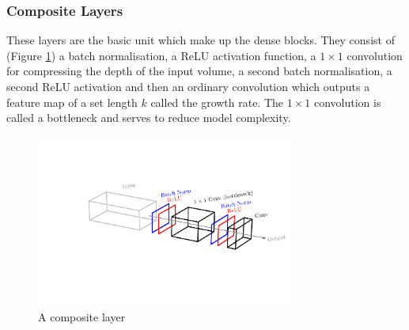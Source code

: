 \subsubsection{Composite Layers}
These layers are the basic unit which make up the dense blocks. They consist of (Figure \ref{fig:machine_learning:composite_layer}) a batch normalisation, a ReLU activation function, a $1\times{}1$ convolution for compressing the depth of the input volume, a second batch normalisation, a second ReLU activation and then an ordinary convolution which outputs a feature map of a set length $k$ called the growth rate. The $1\times{}1$ convolution is called a bottleneck and serves to reduce model complexity.
\begin{figure}[h!]
    \includegraphics[width=0.75\textwidth]{figures/machine_learning/composite_layer.pdf}
    \caption{A composite layer}
        \label{fig:machine_learning:composite_layer}
\end{figure}


